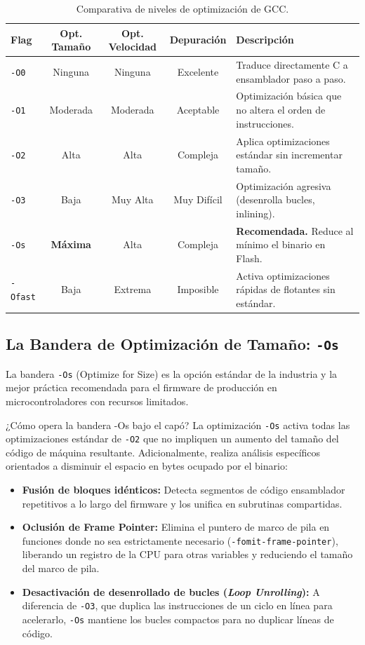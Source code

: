 \documentclass[
10pt, %
a4paper, %
oneside, %
headinclude,footinclude, %
BCOR5mm, %
]{scrartcl}
\begin{document}
\begin{table}[H]
	\centering
	\begin{tabular}{lcccp{5.5cm}}
		\toprule
		\textbf{Flag} & \textbf{Opt. Tamaño} & \textbf{Opt. Velocidad} & \textbf{Depuración} & \textbf{Descripción} \\
		\midrule
		\texttt{-O0} & Ninguna & Ninguna & Excelente & Traduce directamente C a ensamblador paso a paso. \\
		\texttt{-O1} & Moderada & Moderada & Aceptable & Optimización básica que no altera el orden de instrucciones. \\
		\texttt{-O2} & Alta & Alta & Compleja & Aplica optimizaciones estándar sin incrementar tamaño. \\
		\texttt{-O3} & Baja & Muy Alta & Muy Difícil & Optimización agresiva (desenrolla bucles, inlining). \\
		\texttt{-Os} & \textbf{Máxima} & Alta & Compleja & \textbf{Recomendada.} Reduce al mínimo el binario en Flash. \\
		\texttt{-Ofast} & Baja & Extrema & Imposible & Activa optimizaciones rápidas de flotantes sin estándar. \\
		\bottomrule
	\end{tabular}
	\caption{Comparativa de niveles de optimización de GCC.}\label{tab:niveles_optimizacion}
\end{table}

\subsection{La Bandera de Optimización de Tamaño: \texttt{-Os}}
La bandera \texttt{-Os} (Optimize for Size) es la opción estándar de la industria y la mejor práctica recomendada para el firmware de producción en microcontroladores con recursos limitados.

\begin{InfoBox}{¿Cómo opera la bandera -Os bajo el capó?}
	La optimización \texttt{-Os} activa todas las optimizaciones estándar de \texttt{-O2} que no impliquen un aumento del tamaño del código de máquina resultante. Adicionalmente, realiza análisis específicos orientados a disminuir el espacio en bytes ocupado por el binario:
	\begin{itemize}
		\item \textbf{Fusión de bloques idénticos:} Detecta segmentos de código ensamblador repetitivos a lo largo del firmware y los unifica en subrutinas compartidas.
		\item \textbf{Oclusión de Frame Pointer:} Elimina el puntero de marco de pila en funciones donde no sea estrictamente necesario (\texttt{-fomit-frame-pointer}), liberando un registro de la CPU para otras variables y reduciendo el tamaño del marco de pila.
		\item \textbf{Desactivación de desenrollado de bucles (\textit{Loop Unrolling}):} A diferencia de \texttt{-O3}, que duplica las instrucciones de un ciclo en línea para acelerarlo, \texttt{-Os} mantiene los bucles compactos para no duplicar líneas de código.
	\end{itemize}
\end{InfoBox}
\end{document}
